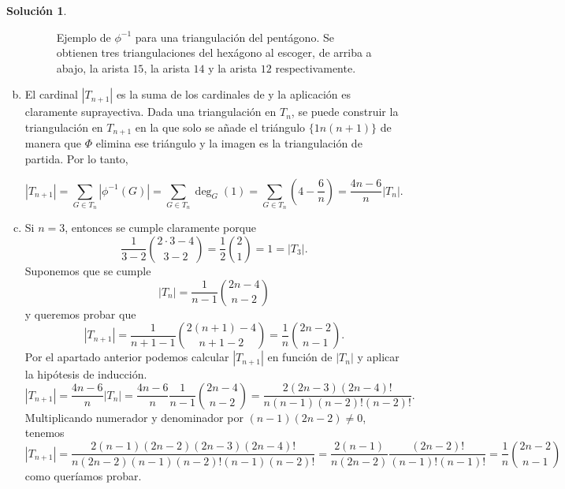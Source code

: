 \documentclass[10pt]{article}
\theoremstyle{definition}
\newtheorem*{sol}{Solución}
\begin{document}
\begin{sol}
\begin{enumerate}[(a)]
\begin{figure}
\caption{Ejemplo de $\phi^{-1}$ para una triangulación del pentágono. Se obtienen tres triangulaciones del hexágono al escoger, de arriba a abajo, la arista $15$, la arista $14$ y la arista $12$ respectivamente.}
\end{figure}

\item El cardinal $|T_{n+1}|$ es la suma de los cardinales de y la aplicación es claramente suprayectiva. Dada una triangulación en $T_n$, se puede construir la triangulación en $T_{n+1}$ en la que solo se añade el triángulo $\{1n(n+1)\}$ de manera que $\Phi$ elimina ese triángulo y la imagen es la triangulación de partida. Por lo tanto,

\[|T_{n+1}|=\sum_{G\in T_n}|\phi^{-1}(G)|=\sum_{G\in T_n}\deg_G(1)=\sum_{G\in T_n}\left(4-\frac{6}{n}\right)=\frac{4n-6}{n}|T_n|.\]

\item Si $n=3$, entonces se cumple claramente porque \[\frac{1}{3-2}\binom{2\cdot 3-4}{3-2}=\frac{1}{2}\binom{2}{1}=1=|T_3|.\] Suponemos que se cumple \[\left|T_n\right|=\frac{1}{n-1}\binom{2n-4}{n-2}\] y queremos probar que \[|T_{n+1}|=\frac{1}{n+1-1}\binom{2(n+1)-4}{n+1-2}=\frac{1}{n}\binom{2n-2}{n-1}.\]
Por el apartado anterior podemos calcular $|T_{n+1}|$ en función de $|T_n|$ y aplicar la hipótesis de inducción.
\[\left|T_{n+1}\right| = \frac{4n-6}{n}\left|T_n\right|
 = \frac{4n-6}{n}\frac{1}{n-1}\binom{2n-4}{n-2}
 = \frac{2(2n-3)(2n-4)!}{n(n-1)(n-2)!(n-2)!}.\]
 Multiplicando numerador y denominador por $(n-1)(2n-2)\neq 0$, tenemos \[\left|T_{n+1}\right|=\frac{2(n-1)(2n-2)(2n-3)(2n-4)!}{n(2n-2)(n-1)(n-2)!(n-1)(n-2)!}=\frac{2(n-1)}{n(2n-2)}\frac{(2n-2)!}{(n-1)!(n-1)!}=\frac{1}{n}\binom{2n-2}{n-1}\]
 como queríamos probar.
\end{enumerate}
\end{sol}
\end{document}
